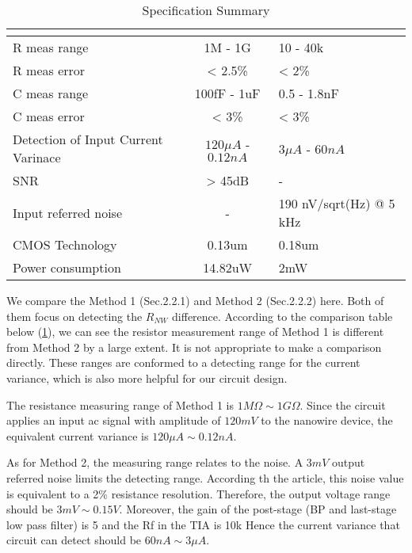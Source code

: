 \begin{table}[!hbt]
    {\fontfamily{}\fontsize{10}{14}\selectfont
    \centering
    \begin{tabular}{l|cp{4cm}}
        & \cite{Juv2} & \cite{Jlockin}\\
        \hline
        R meas range & 1M - 1G & 10 - 40k\\
        \hline
        R meas error & < 2.5\% & < 2\%\\
        \hline
        C meas range & 100fF - 1uF & 0.5 - 1.8nF\\
        \hline
        C meas error & < 3\% & < 3\%\\
        \hline
        Detection of Input Current Varinace &  $120\mu A$ - $0.12n A$ & $3\mu A$ - $60n A$ \\
        \hline
        SNR & > 45dB & - \\
        \hline
        Input referred noise & - & 190 nV/sqrt(Hz) @ 5 kHz \\
        \hline
        CMOS Technology & 0.13um & 0.18um\\
        \hline
        Power consumption & 14.82uW & 2mW\\
    \end{tabular}
    \caption{Specification Summary}
    \label{tb:LVtable}
    }
\end{table}
We compare the Method 1 (Sec.2.2.1) and Method 2 (Sec.2.2.2) here.
Both of them focus on detecting the $R_{NW}$ difference.
According to the comparison table below (\ref{tb:LVtable}), we can see the resistor measurement range of Method 1 is different from Method 2 by a large extent.
It is not appropriate to make a comparison directly.
These ranges are conformed to a detecting range for the current variance, which is also more helpful for our circuit design.

The resistance measuring range of Method 1 is $1M \Omega \sim 1G \Omega$.
Since the circuit applies an input ac signal with amplitude of $120m V$ to the nanowire device, the equivalent current variance is $120\mu A \sim 0.12n A$.

As for Method 2, the measuring range relates to the noise.
A $3m V$ output referred noise limits the detecting range.
According th the article, this noise value is equivalent to a 2\% resistance resolution.
Therefore, the output voltage range should be $3m V \sim 0.15V$.
Moreover, the gain of the post-stage (BP and last-stage low pass filter) is 5 and the Rf in the TIA is 10k
Hence the current variance that circuit can detect should be $60n A \sim 3\mu A$.


